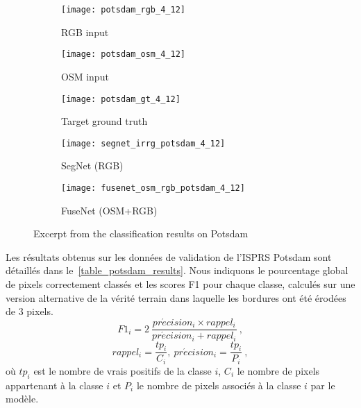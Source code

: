 \begin{figure*}
\begin{subfigure}{0.33\linewidth}
	\texttt{[image: potsdam\_rgb\_4\_12]}
    \caption{RGB input}
\end{subfigure}
\hfill
\begin{subfigure}{0.33\linewidth}
    \texttt{[image: potsdam\_osm\_4\_12]}
    \caption{OSM input}
\end{subfigure}
\hfill
\begin{subfigure}{0.33\linewidth}
	\texttt{[image: potsdam\_gt\_4\_12]}
    \caption{Target ground truth}
\end{subfigure}
\begin{subfigure}{0.49\linewidth}
	\texttt{[image: segnet\_irrg\_potsdam\_4\_12]}
    \caption{SegNet (RGB)}
\end{subfigure}
\hfill
\begin{subfigure}{0.49\linewidth}
	\texttt{[image: fusenet\_osm\_rgb\_potsdam\_4\_12]}
    \caption{FuseNet (OSM+RGB)}
\end{subfigure}
\caption{Excerpt from the classification results on Potsdam}
\label{fig:potsdam_qualitative}
\end{figure*}


Les résultats obtenus sur les données de validation de l'ISPRS Potsdam sont détaillés dans le~\cref{table_potsdam_results}. Nous indiquons le pourcentage global de pixels correctement classés et les scores F1 pour chaque classe, calculés sur une version alternative de la vérité terrain dans laquelle les bordures ont été érodées de 3 pixels.
\begin{equation}
F1_{i} = 2~\frac{pr\acute{e}cision_{i} \times rappel_{i}}{pr\acute{e}cision_{i} + rappel_{i}}~,
\end{equation}
\begin{equation}
rappel_i = \frac{tp_i}{C_i},~ pr\acute{e}cision_i = \frac{tp_i}{P_i}~,
\end{equation}
où $tp_i$ est le nombre de vrais positifs de la classe $i$, $C_i$ le nombre de pixels appartenant à la classe $i$ et $P_i$ le nombre de pixels associés à la classe $i$ par le modèle.

